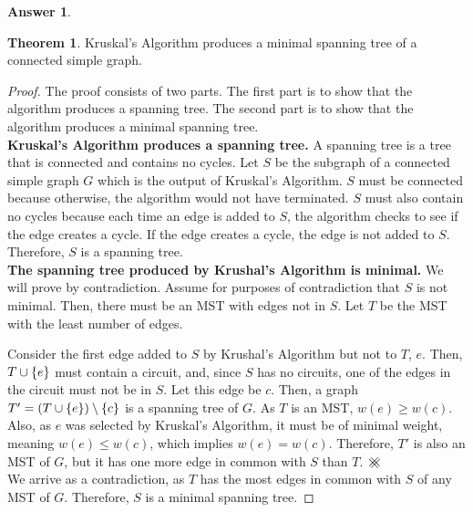 \documentclass[article, 12pt]{article}
\theoremstyle{definition}
\newtheorem{theorem}{Theorem}
\newtheorem{answer}{Answer}
\DeclarePairedDelimiter\set{\{}{\}}
\newcommand{\unite}{\cup}
\newcommand\contradiction{\mathbin{\mathpalette\xhash\relax}}
\newcommand{\xhash}[2]{\ooalign{%
  $#1\xxhash{#1}{-45}$\cr
  $#1\xxhash{#1}{45}$\cr
  }%
}
\newcommand{\xxhash}[2]{\rotatebox[origin=c]{#2}{$#1\parallel$}}
\begin{document}
    \begin{answer}
        \label{a5}
        \begin{theorem}
            Kruskal's Algorithm produces a minimal spanning tree of a connected simple graph.
        \end{theorem}
        \begin{proof}
            The proof consists of two parts. The first part is to show that the algorithm produces a spanning tree. The second part is to show that the algorithm produces a minimal spanning tree.
            \\[12pt]
            \textbf{Kruskal's Algorithm produces a spanning tree.} A spanning tree is a tree that is connected and contains no cycles. Let $S$ be the subgraph of a connected simple graph $G$ which is the output of Kruskal's Algorithm. $S$ must be connected because otherwise, the algorithm would not have terminated. $S$ must also contain no cycles because each time an edge is added to $S$, the algorithm checks to see if the edge creates a cycle. If the edge creates a cycle, the edge is not added to $S$. Therefore, $S$ is a spanning tree.
            \\[12pt]
            \textbf{The spanning tree produced by Krushal's Algorithm is minimal.} We will prove by contradiction. Assume for purposes of contradiction that $S$ is not minimal. Then, there must be an MST with edges not in $S$. Let $T$ be the MST with the least number of edges. 

            Consider the first edge added to $S$ by Krushal's Algorithm but not to $T$, $e$. Then, $T \unite \set*{e}$ must contain a circuit, and, since $S$ has no circuits, one of the edges in the circuit must not be in $S$. Let this edge be $c$. Then, a graph $T' = (T \unite \set*{e}) \setminus \set*{c}$ is a spanning tree of $G$. As $T$ is an MST, $w(e) \geq w(c)$. Also, as $e$ was selected by Kruskal's Algorithm, it must be of minimal weight, meaning $w(e) \leq w(c)$, which implies $w(e) = w(c)$. Therefore, $T'$ is also an MST of $G$, but it has one more edge in common with $S$ than $T$. $\contradiction$
            \\[12pt]
            We arrive as a contradiction, as $T$ has the most edges in common with $S$ of any MST of $G$. Therefore, $S$ is a minimal spanning tree.
        \end{proof}
    \end{answer}
\end{document}

